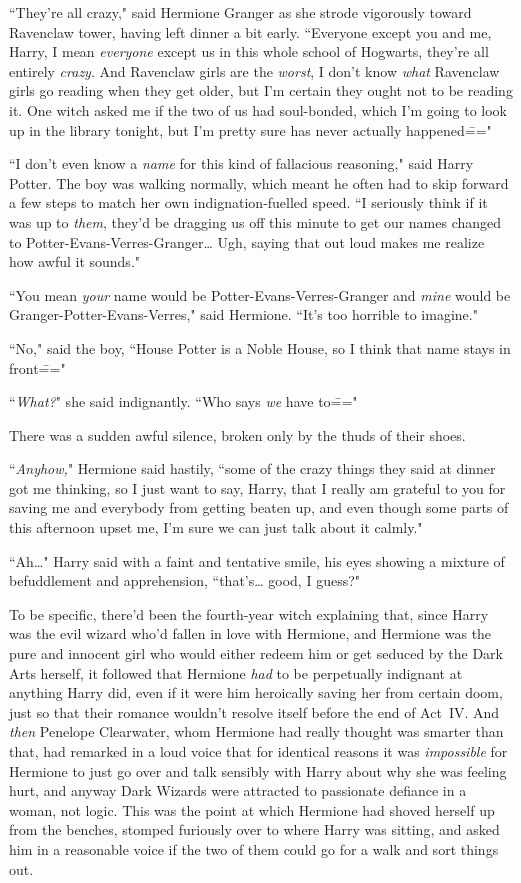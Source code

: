 ``They're all crazy," said Hermione Granger as she strode vigorously toward Ravenclaw tower, having left dinner a bit early. ``Everyone except you and me, Harry, I mean \emph{everyone} except us in this whole school of Hogwarts, they're all entirely \emph{crazy}. And Ravenclaw girls are the \emph{worst}, I don't know \emph{what} Ravenclaw girls go reading when they get older, but I'm certain they ought not to be reading it. One witch asked me if the two of us had soul-bonded, which I'm going to look up in the library tonight, but I'm pretty sure has never actually happened\==="

``I don't even know a \emph{name} for this kind of fallacious reasoning," said Harry Potter. The boy was walking normally, which meant he often had to skip forward a few steps to match her own indignation-fuelled speed. ``I seriously think if it was up to \emph{them}, they'd be dragging us off this minute to get our names changed to Potter-Evans-Verres-Granger{\ldots} Ugh, saying that out loud makes me realize how awful it sounds."

``You mean \emph{your} name would be Potter-Evans-Verres-Granger and \emph{mine} would be Granger-Potter-Evans-Verres," said Hermione. ``It's too horrible to imagine."

``No," said the boy, ``House Potter is a Noble House, so I think that name stays in front\==="

``\emph{What?}" she said indignantly. ``Who says \emph{we} have to\==="

There was a sudden awful silence, broken only by the thuds of their shoes.

``\emph{Anyhow,}" Hermione said hastily, ``some of the crazy things they said at dinner got me thinking, so I just want to say, Harry, that I really am grateful to you for saving me and everybody from getting beaten up, and even though some parts of this afternoon upset me, I'm sure we can just talk about it calmly."

``Ah{\ldots}" Harry said with a faint and tentative smile, his eyes showing a mixture of befuddlement and apprehension, ``that's{\ldots} good, I guess?"

To be specific, there'd been the fourth-year witch explaining that, since Harry was the evil wizard who'd fallen in love with Hermione, and Hermione was the pure and innocent girl who would either redeem him or get seduced by the Dark Arts herself, it followed that Hermione \emph{had} to be perpetually indignant at anything Harry did, even if it were him heroically saving her from certain doom, just so that their romance wouldn't resolve itself before the end of Act~IV. And \emph{then} Penelope Clearwater, whom Hermione had really thought was smarter than that, had remarked in a loud voice that for identical reasons it was \emph{impossible} for Hermione to just go over and talk sensibly with Harry about why she was feeling hurt, and anyway Dark Wizards were attracted to passionate defiance in a woman, not logic. This was the point at which Hermione had shoved herself up from the benches, stomped furiously over to where Harry was sitting, and asked him in a reasonable voice if the two of them could go for a walk and sort things out.

